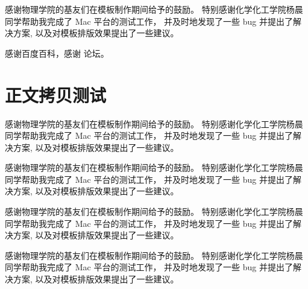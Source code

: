 \documentclass[pageheader,chapter,shorttitle,mathtxf]{NJUbachelor}
\begin{document}








%

\backmatter

\newpage
{}

\nocite{*}

%


\ack

感谢物理学院的基友们在模板制作期间给予的鼓励。
特别感谢化学化工学院杨晨同学帮助我完成了 Mac 平台的测试工作，
并及时地发现了一些 bug 并提出了解决方案,
以及对模板排版效果提出了一些建议。

感谢百度百科，感谢 \CTeX{} 论坛。


\appendix

\chapter{正文拷贝测试}

\songti

感谢物理学院的基友们在模板制作期间给予的鼓励。
特别感谢化学化工学院杨晨同学帮助我完成了 Mac 平台的测试工作，
并及时地发现了一些 bug 并提出了解决方案,
以及对模板排版效果提出了一些建议。

\heiti
感谢物理学院的基友们在模板制作期间给予的鼓励。
特别感谢化学化工学院杨晨同学帮助我完成了 Mac 平台的测试工作，
并及时地发现了一些 bug 并提出了解决方案,
以及对模板排版效果提出了一些建议。

\kaishu
感谢物理学院的基友们在模板制作期间给予的鼓励。
特别感谢化学化工学院杨晨同学帮助我完成了 Mac 平台的测试工作，
并及时地发现了一些 bug 并提出了解决方案,
以及对模板排版效果提出了一些建议。

\fangsong
感谢物理学院的基友们在模板制作期间给予的鼓励。
特别感谢化学化工学院杨晨同学帮助我完成了 Mac 平台的测试工作，
并及时地发现了一些 bug 并提出了解决方案,
以及对模板排版效果提出了一些建议。
\end{document}
